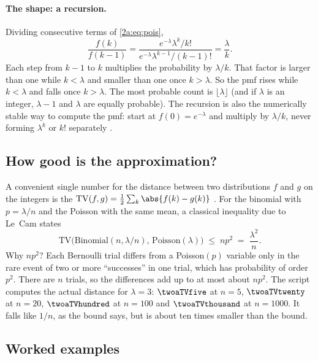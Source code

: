 \paragraph{The shape: a recursion.} Dividing consecutive terms of \eqref{2a:eq:pois},
\begin{equation}
  \frac{f(k)}{f(k-1)}=\frac{e^{-\lambda}\lambda^k/k!}{e^{-\lambda}\lambda^{k-1}/(k-1)!}=\frac\lambda k . \label{2a:eq:poisrec}
\end{equation}
Each step from $k-1$ to $k$ multiplies the probability by $\lambda/k$. That factor is larger than one while $k<\lambda$ and smaller than one once $k>\lambda$. So the pmf rises while $k<\lambda$ and falls once $k>\lambda$. The most probable count is $\lfloor\lambda\rfloor$ (and if $\lambda$ is an integer, $\lambda-1$ and $\lambda$ are equally probable). The recursion is also the numerically stable way to compute the pmf: start at $f(0)=e^{-\lambda}$ and multiply by $\lambda/k$, never forming $\lambda^k$ or $k!$ separately .

\subsection{How good is the approximation?}

A convenient single number for the distance between two distributions $f$ and $g$ on the integers is the  $\mathrm{TV}(f,g)=\tfrac12\sum_k\abs{f(k)-g(k)}$ . For the binomial with $p=\lambda/n$ and the Poisson with the same mean, a classical inequality due to Le~Cam states
\[
  \mathrm{TV}\bigl(\mathrm{Binomial}(n,\lambda/n),\,\mathrm{Poisson}(\lambda)\bigr)\;\le\;np^2\;=\;\frac{\lambda^2}{n}.
\]
Why $np^2$? Each Bernoulli trial differs from a Poisson$(p)$ variable only in the rare event of two or more ``successes'' in one trial, which has probability of order $p^2$. There are $n$ trials, so the differences add up to at most about $np^2$. The script  computes the actual distance for $\lambda=3$: $\twoaTVfive$ at $n=5$, $\twoaTVtwenty$ at $n=20$, $\twoaTVhundred$ at $n=100$ and $\twoaTVthousand$ at $n=1000$. It falls like $1/n$, as the bound says, but is about ten times smaller than the bound.

\subsection{Worked examples}

